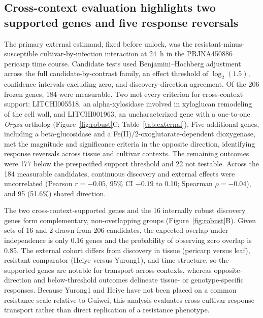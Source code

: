 \documentclass[11pt]{article}
\begin{document}
\subsection{Cross-context evaluation highlights two supported genes and five response reversals}

The primary external estimand, fixed before unlock, was the resistant-minus-susceptible cultivar-by-infection interaction at 24~h in the PRJNA450886 pericarp time course. Candidate tests used Benjamini--Hochberg adjustment across the full candidate-by-contrast family, an effect threshold of $\log_2(1.5)$, confidence intervals excluding zero, and discovery-direction agreement. Of the 206 frozen genes, 184 were measurable. Two met every criterion for cross-context support: LITCHI005518, an alpha-xylosidase involved in xyloglucan remodeling of the cell wall, and LITCHI001963, an uncharacterized gene with a one-to-one \textit{Oryza} ortholog (Figure~\ref{fig:robust}C; Table~\ref{tab:external}). Five additional genes, including a beta-glucosidase and a Fe(II)/2-oxoglutarate-dependent dioxygenase, met the magnitude and significance criteria in the opposite direction, identifying response reversals across tissue and cultivar contexts. The remaining outcomes were 177 below the prespecified support threshold and 22 not testable. Across the 184 measurable candidates, continuous discovery and external effects were uncorrelated (Pearson $r=-0.05$, 95\% CI $-0.19$ to 0.10; Spearman $\rho=-0.04$), and 95 (51.6\%) shared direction.

The two cross-context-supported genes and the 16 internally robust discovery genes form complementary, non-overlapping groups (Figure~\ref{fig:robust}B). Given sets of 16 and 2 drawn from 206 candidates, the expected overlap under independence is only 0.16 genes and the probability of observing zero overlap is 0.85. The external cohort differs from discovery in tissue (pericarp versus leaf), resistant comparator (Heiye versus Yurong1), and time structure, so the supported genes are notable for transport across contexts, whereas opposite-direction and below-threshold outcomes delineate tissue- or genotype-specific responses. Because Yurong1 and Heiye have not been placed on a common resistance scale relative to Guiwei, this analysis evaluates cross-cultivar response transport rather than direct replication of a resistance phenotype.
\end{document}
